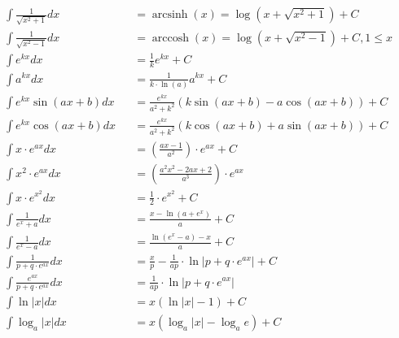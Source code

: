 \begin{footnotesize}
\begin{align*}
         & \int \frac{1}{\sqrt{x^2+1}}dx         &  & =\operatorname{arcsinh}(x)=\log(x+\sqrt{x^2+1})+C                                 \\
         & \int \frac{1}{\sqrt{x^2-1}}dx         &  & =\operatorname{arccosh}(x)=\log(x+\sqrt{x^2-1})+C, 1 \leq x                       \\
         & \int e^{kx}dx                         &  & =\frac{1}{k}e^{kx}+C                                                              \\
         & \int a^{kx}dx                         &  & =\frac{1}{k\cdot \ln(a)}a^{kx}+C                                                  \\
         & \int e^{kx}\sin(ax+b)dx               &  & =\frac{e^{kx}}{a^2+k^2}\left(k\sin(ax+b)-a\cos(ax+b)\right)+C                     \\
         & \int e^{kx}\cos(ax+b)dx               &  & =\frac{e^{kx}}{a^2+k^2}\left(k\cos(ax+b)+a\sin(ax+b)\right)+C                     \\
         & \int x \cdot e^{ax}dx                 &  & =(\frac{ax-1}{a^2})\cdot e^{ax}+C                                                 \\
         & \int x^2 \cdot e^{ax}dx               &  & =(\frac{a^2x^2-2ax+2}{a^3})\cdot e^{ax}                                           \\
         & \int x\cdot e^{x^2}dx                 &  & =\frac{1}{2}\cdot e^{x^2}+C                                                       \\
         & \int \frac{1}{e^x+a}dx                &  & =\frac{x-\ln(a+e^x)}{a}+C                                                         \\
         & \int \frac{1}{e^x-a}dx                &  & =\frac{\ln(e^x-a)-x}{a}+C                                                         \\
         & \int \frac{1}{p+q\cdot e^{ax}}dx      &  & =\frac{x}{p}-\frac{1}{ap}\cdot \ln\vert p+q\cdot e^{ax}\vert+C                    \\
         & \int \frac{e^{ax}}{p+q\cdot e^{ax}}dx &  & =\frac{1}{ap}\cdot \ln\vert p+q\cdot e^{ax}\vert                                  \\
         & \int \ln\vert x\vert dx               &  & =x(\ln\vert x \vert -1)+C                                                         \\
         & \int \log_a\vert x \vert dx           &  & =x(\log_a\vert x\vert -\log_a e)+C                                                \\

\end{align*}
\end{footnotesize}

